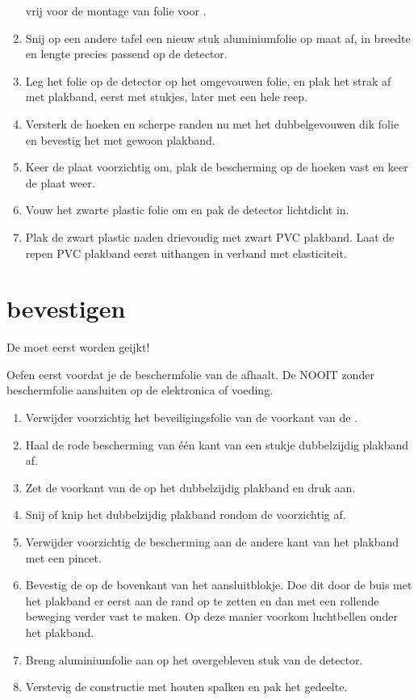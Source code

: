 \begin{enumerate}
    vrij voor de montage van folie voor \pmt.
    \item Snij op een andere tafel een nieuw stuk aluminiumfolie op maat
    af, in breedte en lengte precies passend op de detector.
    \item Leg het folie op de detector op het omgevouwen folie, en plak
    het strak af met plakband, eerst met stukjes, later met een hele
    reep.
    \item Versterk de hoeken en scherpe randen nu met het dubbelgevouwen
    dik folie en bevestig het met gewoon plakband.
    \item Keer de plaat voorzichtig om, plak de bescherming op de hoeken
    vast en keer de plaat weer.
    \item Vouw het zwarte plastic folie om en pak de detector lichtdicht
    in.
    \item Plak de zwart plastic naden drievoudig met zwart PVC plakband.
    Laat de repen PVC plakband eerst uithangen in verband met
    elasticiteit.
\end{enumerate}


\section{\pmt bevestigen}

De \pmt moet eerst worden geijkt!

Oefen eerst voordat je de beschermfolie van de \pmt afhaalt. De \pmt
NOOIT zonder beschermfolie aansluiten op de elektronica of voeding.

\begin{enumerate}
    \item Verwijder voorzichtig het beveiligingsfolie van de voorkant
    van de \pmt.
    \item Haal de rode bescherming van één kant van een stukje
    dubbelzijdig plakband af.
    \item Zet de voorkant van de \pmt op het dubbelzijdig plakband en
    druk aan.
    \item Snij of knip het dubbelzijdig plakband rondom de \pmt
    voorzichtig af.
    \item Verwijder voorzichtig de bescherming aan de andere kant van
    het plakband met een pincet.
    \item Bevestig de \pmt op de bovenkant van het aansluitblokje. Doe
    dit door de buis met het plakband er eerst aan de rand op te zetten
    en dan met een rollende beweging verder vast te maken. Op deze
    manier voorkom luchtbellen onder het plakband.
    \item Breng aluminiumfolie aan op het overgebleven stuk van de
    detector.
    \item Verstevig de \pmt constructie met houten spalken en pak het
    \pmt gedeelte.
\end{enumerate}




